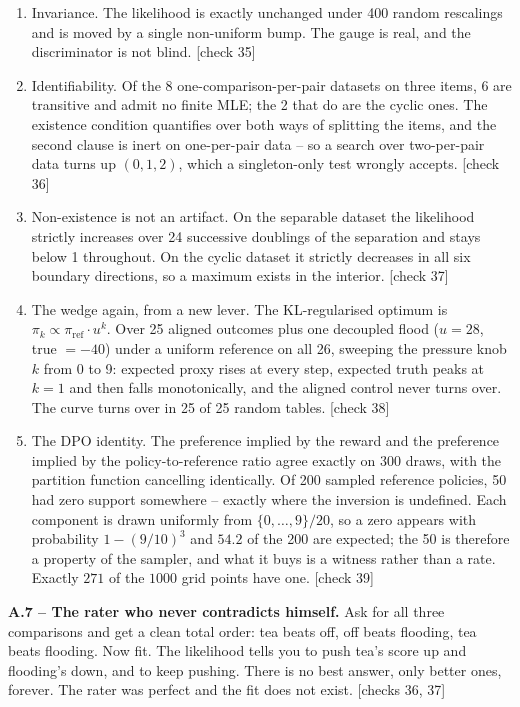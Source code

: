 \begin{enumerate}
\item Invariance. The likelihood is exactly unchanged under 400 random rescalings and is moved by a single non-uniform bump. The gauge is real, and the discriminator is not blind. [check 35]
\item Identifiability. Of the 8 one-comparison-per-pair datasets on three items, 6 are transitive and admit no finite MLE; the 2 that do are the cyclic ones. The existence condition quantifies over both ways of splitting the items, and the second clause is inert on one-per-pair data -- so a search over two-per-pair data turns up $(0,1,2)$, which a singleton-only test wrongly accepts. [check 36]
\item Non-existence is not an artifact. On the separable dataset the likelihood strictly increases over 24 successive doublings of the separation and stays below 1 throughout. On the cyclic dataset it strictly decreases in all six boundary directions, so a maximum exists in the interior. [check 37]
\item The wedge again, from a new lever. The KL-regularised optimum is $\pi_k \propto \pi_{\mathrm{ref}} \cdot u^k$. Over 25 aligned outcomes plus one decoupled flood ($u = 28$, true $= -40$) under a uniform reference on all 26, sweeping the pressure knob $k$ from 0 to 9: expected proxy rises at every step, expected truth peaks at $k = 1$ and then falls monotonically, and the aligned control never turns over. The curve turns over in 25 of 25 random tables. [check 38]
\item The DPO identity. The preference implied by the reward and the preference implied by the policy-to-reference ratio agree exactly on 300 draws, with the partition function cancelling identically. Of 200 sampled reference policies, 50 had zero support somewhere -- exactly where the inversion is undefined. Each component is drawn uniformly from $\{0,\dots,9\}/20$, so a zero appears with probability $1-(9/10)^3$ and $54.2$ of the 200 are expected; the 50 is therefore a property of the sampler, and what it buys is a witness rather than a rate. Exactly $271$ of the $1000$ grid points have one. [check 39]
\end{enumerate}


\textbf{A.7 -- The rater who never contradicts himself.} Ask for all three comparisons and get a clean total order: tea beats off, off beats flooding, tea beats flooding. Now fit. The likelihood tells you to push tea's score up and flooding's down, and to keep pushing. There is no best answer, only better ones, forever. The rater was perfect and the fit does not exist. [checks 36, 37]

